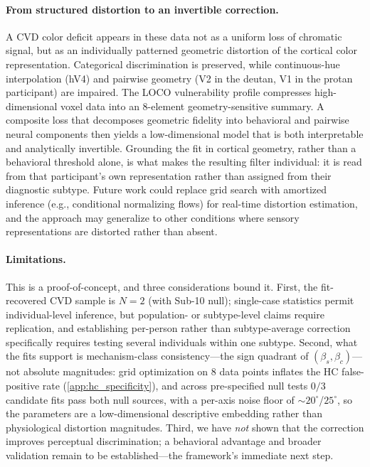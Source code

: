 \documentclass{article}
\begin{document}
\paragraph{From structured distortion to an invertible correction.}
A CVD color deficit appears in these data not as a uniform loss of chromatic signal, but as an individually patterned geometric distortion of the cortical color representation.
Categorical discrimination is preserved, while continuous-hue interpolation (hV4) and pairwise geometry (V2 in the deutan, V1 in the protan participant) are impaired.
The LOCO vulnerability profile compresses high-dimensional voxel data into an 8-element geometry-sensitive summary.
A composite loss that decomposes geometric fidelity into behavioral and pairwise neural components then yields a low-dimensional model that is both interpretable and analytically invertible.
Grounding the fit in cortical geometry, rather than a behavioral threshold alone, is what makes the resulting filter individual: it is read from that participant's own representation rather than assigned from their diagnostic subtype.
Future work could replace grid search with amortized inference (e.g., conditional normalizing flows) for real-time distortion estimation, and the approach may generalize to other conditions where sensory representations are distorted rather than absent.

\paragraph{Limitations.}
This is a proof-of-concept, and three considerations bound it.
First, the fit-recovered CVD sample is $N = 2$ (with Sub-10 null); single-case statistics \citep{crawford1998} permit individual-level inference, but population- or subtype-level claims require replication, and establishing per-person rather than subtype-average correction specifically requires testing several individuals within one subtype.
Second, what the fits support is mechanism-class consistency---the sign quadrant of $(\beta_s, \beta_c)$---not absolute magnitudes: grid optimization on 8 data points inflates the HC false-positive rate (\cref{app:hc_specificity}), and across pre-specified null tests $0/3$ candidate fits pass both null sources, with a per-axis noise floor of ${\sim}20^\circ$/$25^\circ$, so the parameters are a low-dimensional descriptive embedding rather than physiological distortion magnitudes.
Third, we have \emph{not} shown that the correction improves perceptual discrimination; a behavioral advantage and broader validation remain to be established---the framework's immediate next step.
\end{document}
